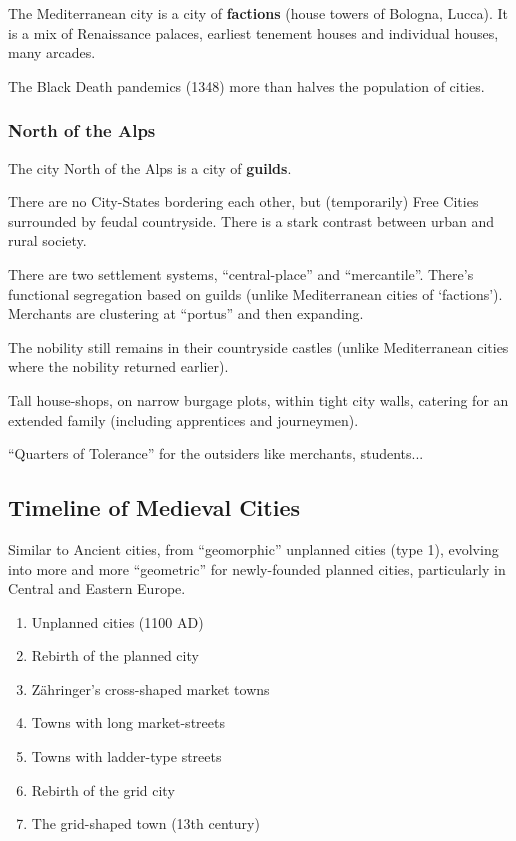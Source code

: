 \documentclass{article}
\begin{document}
The Mediterranean city is a city of \textbf{factions} (house towers of Bologna, Lucca). It is a mix of Renaissance palaces, earliest tenement houses and individual houses, many arcades.

The Black Death pandemics (1348) more than halves the population of cities. 

\subsubsection{North of the Alps}

The city North of the Alps is a city of \textbf{guilds}. 

There are no City-States bordering each other, but (temporarily) Free Cities surrounded by feudal countryside. There is a stark contrast between urban and rural society.

There are two settlement systems, ``central-place'' and ``mercantile''. There's functional segregation based on guilds (unlike Mediterranean cities of `factions').
Merchants are clustering at ``portus'' and then expanding.

The nobility still remains in their countryside castles (unlike Mediterranean cities where the nobility returned earlier). 

Tall house-shops, on narrow burgage plots, within tight city walls, catering for an extended family (including apprentices and journeymen).

``Quarters of Tolerance'' for the outsiders like merchants, students...

\subsection{Timeline of Medieval Cities}

Similar to Ancient cities, from ``geomorphic'' unplanned cities (type 1), evolving into more and more ``geometric'' for newly-founded planned cities, particularly in Central and Eastern Europe.

\begin{enumerate}
	\item Unplanned cities (1100 AD)
	\item Rebirth of the planned city
	\item Zähringer's cross-shaped market towns
	\item Towns with long market-streets
	\item Towns with ladder-type streets
	\item Rebirth of the grid city
	\item The grid-shaped town (13th century)
\end{enumerate}
\end{document}
